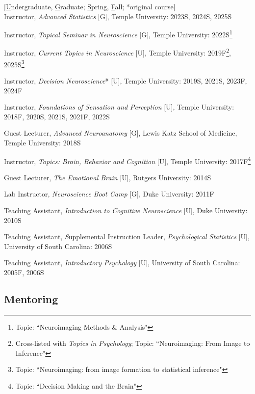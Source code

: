 \documentclass[11pt, letterpaper]{article}
\begin{document}
\begin{hangparas}{.5in}{1}

[\underline{U}ndergraduate, \underline{G}raduate; \underline{S}pring, \underline{F}all; *original course]  \\

Instructor, \textit{Advanced Statistics} [G], Temple University: 2023S, 2024S, 2025S

Instructor, \textit{Topical Seminar in Neuroscience} [G], Temple University: 2022S\footnote{Topic: ``Neuroimaging Methods \& Analysis"}

Instructor, \textit{Current Topics in Neuroscience} [U], Temple University: 2019F\footnote{Cross-listed with \textit{Topics in Psychology}; Topic: ``Neuroimaging: From Image to Inference"}, 2025S\footnote{Topic: ``Neuroimaging: from image formation to statistical inference"}

Instructor, \textit{Decision Neuroscience}* [U], Temple University: 2019S, 2021S, 2023F, 2024F

Instructor, \textit{Foundations of Sensation and Perception} [U], Temple University: 2018F, 2020S, 2021S, 2021F, 2022S

Guest Lecturer, \textit{Advanced Neuroanatomy} [G], Lewis Katz School of Medicine, Temple University: 2018S

Instructor, \textit{Topics: Brain, Behavior and Cognition} [U], Temple University: 2017F\footnote{Topic: ``Decision Making and the Brain"}

Guest Lecturer, \textit{The Emotional Brain} [U], Rutgers University: 2014S

Lab Instructor, \textit{Neuroscience Boot Camp} [G], Duke University: 2011F

Teaching Assistant, \textit{Introduction to Cognitive Neuroscience} [U], Duke University: 2010S

Teaching Assistant, \textit
Supplemental Instruction Leader, \textit{Psychological Statistics} [U], University of South Carolina: 2006S

Teaching Assistant, \textit{Introductory Psychology} [U], University of South Carolina: 2005F, 2006S \\

\end{hangparas}


\subsection*{Mentoring}
\end{document}

